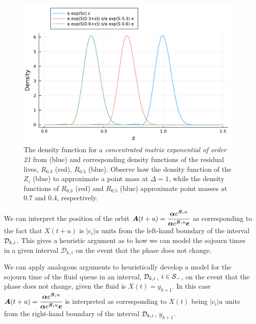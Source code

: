 \begin{figure}
\centering
\includegraphics[width=\textwidth]{chapter2/figs/ME_residual_life_density.pdf}
\caption{The density function for a \emph{concentrated matrix exponential of order 21} from \citep{hhat2020} (blue) and corresponding density functions of the residual lives, \(R_{0.3}\) (red), \(R_{0.5}\) (blue). Observe how the density function of the \(Z_i\) (blue) to approximate a point mass at \(\Delta=1\), while the density functions of \(R_{0.3}\) (red) and \(R_{0.5}\) (blue) approximate point masses at \(0.7\) and \(0.4\), respectively. }
\label{fig:residual distributions}
\end{figure}

We can interpret the position of the orbit \(\boldsymbol A(t+u) = \cfrac{\boldsymbol\alpha e^{\boldsymbol S_iu } }{\boldsymbol\alpha e^{\boldsymbol S_iu } \boldsymbol e}\) as corresponding to the fact that \(X(t+u)\) is \(|c_i|u\) units from the left-hand boundary of the interval \(\mathcal{D}_{k,i}\). This gives a heuristic argument as to how we can model the sojourn times in a given interval \(\mathcal D_{k,i}\) on the event that the phase does not change. 

We can apply analogous arguments to heuristically develop a model for the sojourn time of the fluid queue in an interval, \(\mathcal{D}_{k,i}\), \(i\in\mathcal{S}_-\), on the event that the phase does not change, given the fluid is \(X(t)=y_{k+1}\). In this case \(\boldsymbol A(t+u) = \cfrac{\boldsymbol\alpha e^{\boldsymbol S_iu } }{\boldsymbol\alpha e^{\boldsymbol S_iu } \boldsymbol e}\) is interpreted as corresponding to \(X(t)\) being \(|c_i|u\) units from the right-hand boundary of the interval \(\mathcal{D}_{k,i}\), \(y_{k+1}\). 

